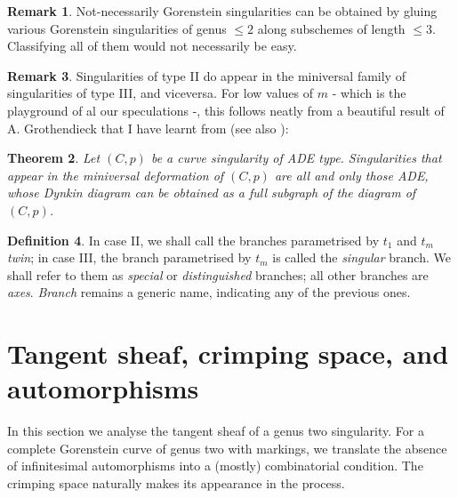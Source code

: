 \documentclass[11pt]{amsart}
\theoremstyle{plain}
\newtheorem{thm}{Theorem}[section]
\theoremstyle{definition}
\newtheorem{dfn}[thm]{Definition}
\newtheorem{rem}[thm]{Remark}
\begin{document}
\begin{rem}
 Not-necessarily Gorenstein singularities can be obtained by gluing various Gorenstein singularities of genus $\leq 2$ along subschemes of length $\leq 3$. Classifying all of them would not necessarily be easy.
\end{rem}

\begin{rem}
 Singularities of type II do appear in the miniversal family of singularities of type III, and viceversa. For low values of $m$ - which is the playground of al our speculations -, this follows neatly from a beautiful result of A. Grothendieck that I have learnt from \cite{C-ML} (see also \cite{Arnold,Demazure}):
 \begin{thm}
  Let $(C,p)$ be a curve singularity of ADE type. Singularities that appear in the miniversal deformation of $(C,p)$ are all and only those ADE, whose Dynkin diagram can be obtained as a full subgraph of the diagram of $(C,p)$.
 \end{thm}
\end{rem}

\begin{dfn}
 In case II, we shall call the branches parametrised by $t_1$ and $t_m$ \emph{twin}; in case III, the branch parametrised by $t_m$ is called the \emph{singular} branch. We shall refer to them as \emph{special} or \emph{distinguished} branches; all other branches are \emph{axes}. \emph{Branch} remains a generic name, indicating any of the previous ones.
\end{dfn}


\section{Tangent sheaf, crimping space, and automorphisms}
In this section we analyse the tangent sheaf of a genus two singularity. For a complete Gorenstein curve of genus two with markings, we translate the absence of infinitesimal automorphisms into a (mostly) combinatorial condition. The crimping space naturally makes its appearance in the process.
\end{document}
